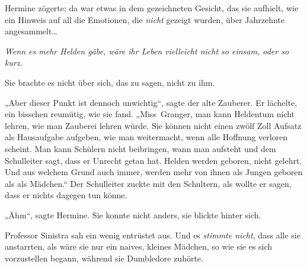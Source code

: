 Hermine zögerte; da war etwas in dem gezeichneten Gesicht, das sie aufhielt, wie ein Hinweis auf all die Emotionen, die \emph{nicht} gezeigt wurden, über Jahrzehnte angesammelt…

\emph{Wenn es mehr Helden gäbe, wäre ihr Leben vielleicht nicht so einsam, oder so kurz.}

Sie brachte es nicht über sich, das zu sagen, nicht zu ihm.

„Aber dieser Punkt ist dennoch unwichtig“, sagte der alte Zauberer. Er lächelte, ein bisschen reumütig, wie sie fand. „Miss~Granger, man kann Heldentum nicht lehren, wie man Zauberei lehren würde. Sie können nicht einen zwölf Zoll Aufsatz als Hausaufgabe aufgeben, wie man weitermacht, wenn alle Hoffnung verloren scheint. Man kann Schülern nicht beibringen, wann man aufsteht und dem Schulleiter sagt, dass er Unrecht getan hat. Helden werden geboren, nicht gelehrt. Und aus welchem Grund auch immer, werden mehr von ihnen als Jungen geboren als als Mädchen.“ Der Schulleiter zuckte mit den Schultern, als wollte er sagen, dass er nichts dagegen tun könne.

„Ähm“, sagte Hermine. Sie konnte nicht anders, sie blickte hinter sich.

Professor Sinistra sah ein wenig entrüstet aus. Und es \emph{stimmte nicht}, dass alle sie anstarrten, als wäre sie nur ein naives, kleines Mädchen, so wie sie es sich vorzustellen begann, während sie Dumbledore zuhörte.


